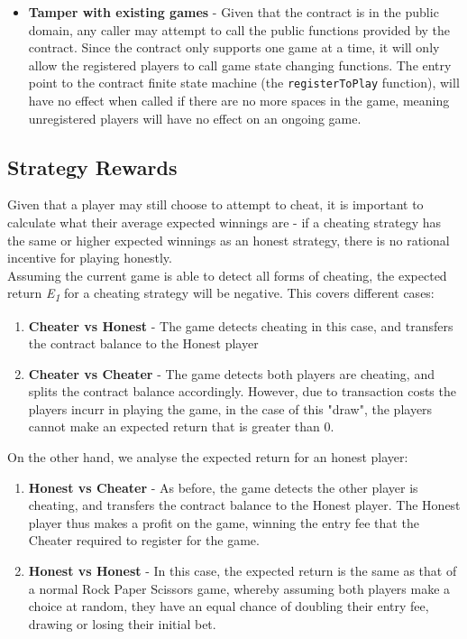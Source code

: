 \documentclass[a4paper, twoside]{article}
\begin{document}
\begin{itemize}
	\item \textbf{Tamper with existing games} - Given that the contract is in the public domain, any caller may attempt to call the public functions provided by the contract. Since the contract only supports one game at a time, it will only allow the registered players to call game state changing functions. The entry point to the contract finite state machine (the \texttt{registerToPlay} function), will have no effect when called if there are no more spaces in the game, meaning unregistered players will have no effect on an ongoing game.
\end{itemize}

\subsection{Strategy Rewards}

Given that a player may still choose to attempt to cheat, it is important to calculate what their average expected winnings are - if a cheating strategy has the same or higher expected winnings as an honest strategy, there is no rational incentive for playing honestly. \\

Assuming the current game is able to detect all forms of cheating, the expected return \textit{E\textsubscript{1}} for a cheating strategy will be negative. This covers different cases:

\begin{enumerate}
	\item \textbf{Cheater vs Honest} - The game detects cheating in this case, and transfers the contract balance to the Honest player
	\item \textbf{Cheater vs Cheater} - The game detects both players are cheating, and splits the contract balance accordingly. However, due to transaction costs the players incurr in playing the game, in the case of this "draw", the players cannot make an expected return that is greater than 0.
\end{enumerate} 

On the other hand, we analyse the expected return for an honest player:

\begin{enumerate}
	\item \textbf{Honest vs Cheater} - As before, the game detects the other player is cheating, and transfers the contract balance to the Honest player. The Honest player thus makes a profit on the game, winning the entry fee that the Cheater required to register for the game.
	\item \textbf{Honest vs Honest} - In this case, the expected return is the same as that of a normal Rock Paper Scissors game, whereby assuming both players make a choice at random, they have an equal chance of doubling their entry fee, drawing or losing their initial bet.
\end{enumerate}
\end{document}
